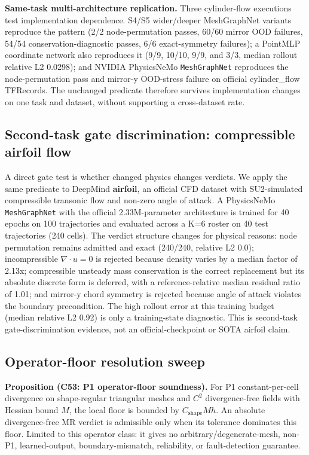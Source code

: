 \documentclass[preprint,12pt,authoryear]{elsarticle}
\begin{document}
\textbf{Same-task multi-architecture replication.} Three cylinder-flow executions test implementation dependence. S4/S5 wider/deeper MeshGraphNet variants reproduce the pattern (2/2 node-permutation passes, 60/60 mirror OOD failures, 54/54 conservation-diagnostic passes, 6/6 exact-symmetry failures); a PointMLP coordinate network also reproduces it (9/9, 10/10, 9/9, and 3/3, median rollout relative L2 0.0298); and NVIDIA PhysicsNeMo \texttt{MeshGraphNet} reproduces the node-permutation pass and mirror-y OOD-stress failure on official cylinder\_flow TFRecords. The unchanged predicate therefore survives implementation changes on one task and dataset, without supporting a cross-dataset rate.

\subsection{Second-task gate discrimination: compressible airfoil flow}
\label{subsec:second-task}

A direct gate test is whether changed physics changes verdicts. We apply the same predicate to DeepMind \textbf{airfoil}, an official CFD dataset with SU2-simulated compressible transonic flow and non-zero angle of attack. A PhysicsNeMo \texttt{MeshGraphNet} with the official 2.33M-parameter architecture is trained for 40 epochs on 100 trajectories and evaluated across a K=6 roster on 40 test trajectories (240 cells). The verdict structure changes for physical reasons: node permutation remains admitted and exact (240/240, relative L2 0.0); incompressible $\nabla\cdot u=0$ is rejected because density varies by a median factor of 2.13x; compressible unsteady mass conservation is the correct replacement but its absolute discrete form is deferred, with a reference-relative median residual ratio of 1.01; and mirror-y chord symmetry is rejected because angle of attack violates the boundary precondition. The high rollout error at this training budget (median relative L2 0.92) is only a training-state diagnostic. This is second-task gate-discrimination evidence, not an official-checkpoint or SOTA airfoil claim.

\subsection{Operator-floor resolution sweep}
\label{subsec:operator-floor-sweep}

\noindent\begin{minipage}{\linewidth}
\textbf{Proposition (C53: P1 operator-floor soundness).}
For P1 constant-per-cell divergence on shape-regular triangular meshes and
$C^2$ divergence-free fields with Hessian bound $M$, the local floor is bounded
by $C_{\mathrm{shape}}Mh$. An absolute divergence-free MR verdict is admissible
only when its tolerance dominates this floor. Limited to this operator class:
it gives no arbitrary/degenerate-mesh, non-P1, learned-output,
boundary-mismatch, reliability, or fault-detection guarantee.
\end{minipage}
\medskip
\end{document}
